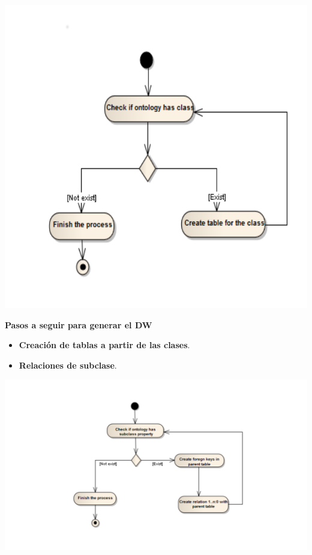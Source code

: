 \documentclass{fancyslides}
\begin{document}
\begin{frame}
\misc
{
\begin{center}
\includegraphics[scale=0.2]{create_tables}
\end{center}
}
\end{frame}


\begin{frame}
\misc
{ \textbf{\Large Pasos a seguir para generar el DW}
\newline
\newline

\begin{itemize}
  \item \textbf{Creación de tablas a partir de las clases}.
  \item \textbf{Relaciones de subclase}.
\end{itemize}

}
\end{frame}

\begin{frame}
\misc
{
\begin{center}
\includegraphics[scale=0.2]{is_a}
\end{center}
}
\end{frame}
\end{document}
